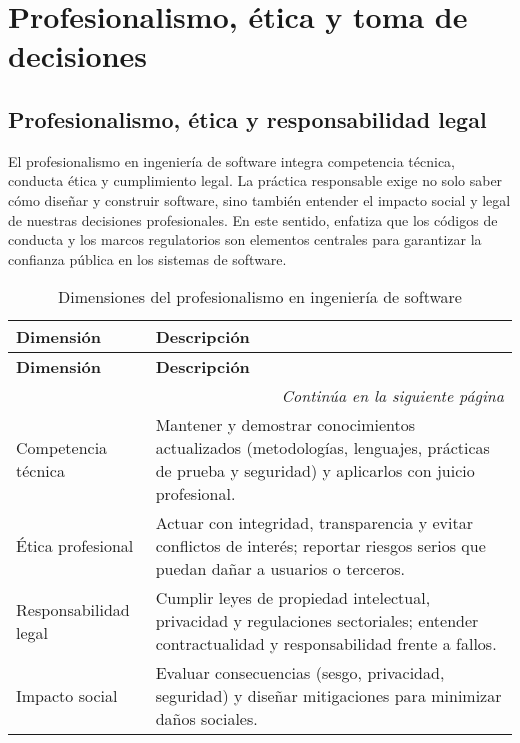 \chapter{Profesionalismo, ética y toma de decisiones}

\section{Profesionalismo, ética y responsabilidad legal}
El profesionalismo en ingeniería de software integra competencia técnica, conducta ética y cumplimiento legal. La práctica responsable exige no solo saber cómo diseñar y construir software, sino también entender el impacto social y legal de nuestras decisiones profesionales. En este sentido, \textcite{swebok2024} enfatiza que los códigos de conducta y los marcos regulatorios son elementos centrales para garantizar la confianza pública en los sistemas de software.

\begin{longtable}{p{3cm} p{12cm}}
\caption{Dimensiones del profesionalismo en ingeniería de software} \\
\toprule
\textbf{Dimensión} & \textbf{Descripción} \\
\midrule
\endfirsthead

\toprule
\textbf{Dimensión} & \textbf{Descripción} \\
\midrule
\endhead

\multicolumn{2}{r}{\textit{Continúa en la siguiente página}} \\
\endfoot

\bottomrule
\endlastfoot

Competencia técnica & Mantener y demostrar conocimientos actualizados (metodologías, lenguajes, prácticas de prueba y seguridad) y aplicarlos con juicio profesional. \\

Ética profesional & Actuar con integridad, transparencia y evitar conflictos de interés; reportar riesgos serios que puedan dañar a usuarios o terceros. \\

Responsabilidad legal & Cumplir leyes de propiedad intelectual, privacidad y regulaciones sectoriales; entender contractualidad y responsabilidad frente a fallos. \\

Impacto social & Evaluar consecuencias (sesgo, privacidad, seguridad) y diseñar mitigaciones para minimizar daños sociales. \\
\end{longtable}

